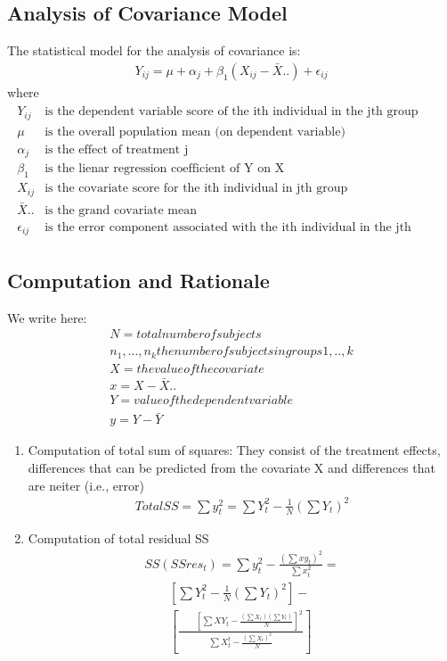 \documentclass[a4paper]{article}
\begin{document}
\subsection{Analysis of Covariance Model}
The statistical model for the analysis of covariance is: 
\begin{align}
  Y_{ij} = \mu + \alpha_j + \beta_1(X_{ij} - \bar{X}..) + \epsilon_{ij}
\end{align}
where
\begin{eqnarray*}
  \begin{array}{ll}
    Y_{ij} & \text{is the dependent variable score of the ith individual in the jth group} \\
    \mu &\text{is the overall population mean (on dependent variable)} \\
    \alpha_j &\text{is the effect of treatment j} \\
    \beta_1 &\text{is the lienar regression coefficient of Y on X} \\
    X_{ij}&\text{is the covariate score for the ith individual in jth group} \\
    \bar{X}.. &\text{is the grand covariate mean} \\
    \epsilon_{ij}&\text{is the error component associated with the ith individual in the jth group }
  \end{array}
\end{eqnarray*}

\subsection{Computation and Rationale}
We write here: 
\begin{eqnarray*}
N = total number of subjects \\
n_1, ..., n_k the number of subjects in groups 1,..,k \\
X = the value of the covariate \\
x = X-\bar{X}.. \\
Y = value of the dependent variable \\
y = Y-\bar{Y} 
\end{eqnarray*} 

\begin{enumerate}
  \item Computation of total sum of squares: They consist of the treatment effects, differences that can be predicted from the covariate X and differences that are neiter (i.e., error) 
  \begin{align}
    Total SS = \sum{y_t^2} = \sum{Y_t^2} - \frac{1}{N}              (\sum{Y_t})^2
  \end{align}
  
  \item Computation of total residual SS 
  \begin{eqnarray}
  SS(SSres_t) = \sum{y_t^2} - \frac{(\sum{xy_t})^2}{\sum{x_t^2}} = \\
  \qquad[\sum{Y_t^2} - \frac{1}{N}(\sum{Y_t})^2] - \\
  \qquad[\frac{\qquad[\sum{XY_t} -
  \frac{(\sum{X_t})(\sum{Y_t})}{N}]^2}{\sum{X_t^t} - \frac{(\sum{X_t})^2}{N}}]
  \end{eqnarray}
\end{enumerate}
\end{document}
